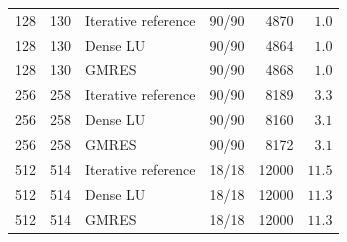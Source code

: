 \begin{table}[!htbp]
\begin{tabular}{rrlrrr}
128 & 130 & Iterative reference & 90/90 & 4870 & $1.0$\\
128 & 130 & Dense LU & 90/90 & 4864 & $1.0$\\
128 & 130 & GMRES & 90/90 & 4868 & $1.0$\\
256 & 258 & Iterative reference & 90/90 & 8189 & $3.3$\\
256 & 258 & Dense LU & 90/90 & 8160 & $3.1$\\
256 & 258 & GMRES & 90/90 & 8172 & $3.1$\\
512 & 514 & Iterative reference & 18/18 & 12000 & $11.5$\\
512 & 514 & Dense LU & 18/18 & 12000 & $11.3$\\
512 & 514 & GMRES & 18/18 & 12000 & $11.3$\\
\bottomrule
\end{tabular}
\end{table}
